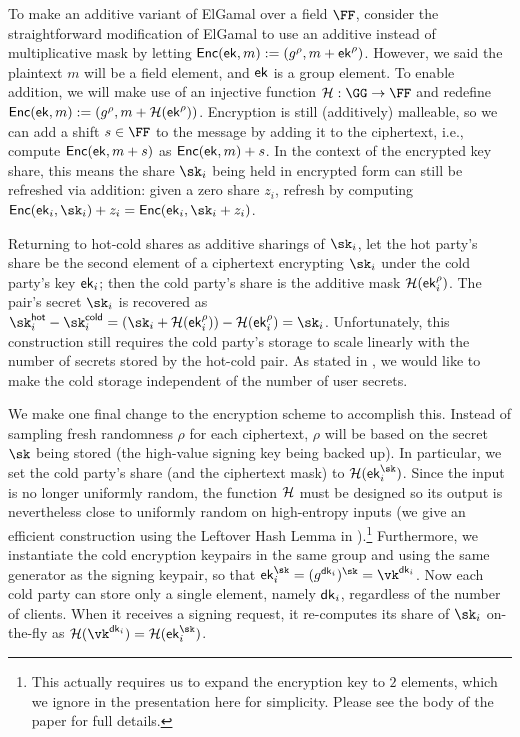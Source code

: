 To make an additive variant of ElGamal over a field $\FF$, consider the straightforward modification of ElGamal to use an additive instead of multiplicative mask by letting ${\mathsf{Enc}}(\mathsf{ek}, m) := (g^\rho, m + \mathsf{ek}^\rho)$. However, we said the plaintext $m$ will be a field element, and $\mathsf{ek}$ is a group element. To enable addition, we will make use of an injective function $\lhlhash: \GG \to \FF$ and redefine ${\mathsf{Enc}}(\mathsf{ek}, m) := (g^\rho, m + \mathcal{H}(\mathsf{ek}^\rho))$. Encryption is still (additively) malleable, so we can add a shift $s \in \FF$ to the message by adding it to the ciphertext, i.e., compute ${\mathsf{Enc}}(\mathsf{ek}, m + s)$ as ${\mathsf{Enc}}(\mathsf{ek}, m) + s$. In the context of the encrypted key share, this means the share $\sk_i$ being held in encrypted form can still be refreshed via addition: given a zero share $z_i$, refresh by computing $\enc(\ek_i, \sk_i) + z_i = \enc(\ek_i, \sk_i + z_i)$.

Returning to hot-cold shares as additive sharings of $\sk_i$, let the hot party's share be the second element of a ciphertext encrypting $\sk_i$ under the cold party's key $\mathsf{ek}_i$; then the cold party's share is the additive mask $\mathcal{H}(\mathsf{ek}_i^\rho)$. The pair's secret $\sk_i$ is recovered as $\sk_i^\hot - \sk_i^\cold = (\sk_i+\lhlhash(\ek_i^\rho)) - \lhlhash(\ek_i^\rho) = \sk_i$. Unfortunately, this construction still requires the cold party's storage to scale linearly with the number of secrets stored by the hot-cold pair. As stated in , we would like to make the cold storage independent of the number of user secrets.

We make one final change to the encryption scheme to accomplish this. Instead of sampling fresh randomness $\rho$ for each ciphertext, $\rho$ will be based on the secret $\sk$ being stored (the high-value signing key being backed up). In particular, we set the cold party's share (and the ciphertext mask) to $\lhlhash(\ek_i^{\sk})$. Since the input is no longer uniformly random, the function $\mathcal{H}$ must be designed so its output is nevertheless close to uniformly random on high-entropy inputs (we give an efficient construction using the Leftover Hash Lemma in ).\footnote{This actually requires us to expand the encryption key to $2$ elements, which we ignore in the presentation here for simplicity.  Please see the body of the paper for full details.} Furthermore, we instantiate the cold encryption keypairs in the same group and using the same generator as the signing keypair, so that $\ek_i^{\sk} = (g^{\dk_i})^{\sk} = \vk^{\dk_i}$. Now each cold party can store only a single element, namely $\mathsf{dk}_i$, regardless of the number of clients. When it receives a signing request, it re-computes its share of $\sk_i$ on-the-fly as $\lhlhash(\vk^{\dk_i}) = \lhlhash(\ek_i^{\sk})$.

